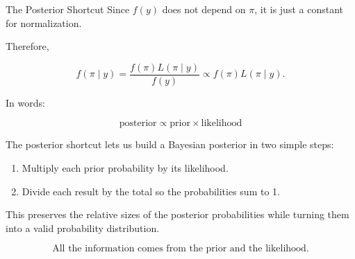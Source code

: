 \documentclass[12pt]{beamer}
\begin{document}
\begin{frame}{}
\begin{block}{The Posterior Shortcut}
Since $f(y)$ does not depend on $\pi$, it is just a constant for normalization.

\vspace{0.4cm}
Therefore,

\[
f(\pi \mid y)
= \frac{f(\pi)L(\pi \mid y)}{f(y)}
\propto f(\pi)L(\pi \mid y).
\]

\vspace{0.6cm}
In words:

\[
\boxed{\text{posterior} \propto \text{prior} \times \text{likelihood}}
\]
\end{block}
\end{frame}

\begin{frame}{}
The posterior shortcut lets us build a Bayesian posterior in two simple steps:

\begin{enumerate}
\item Multiply each prior probability by its likelihood.
\item Divide each result by the total so the probabilities sum to 1.
\end{enumerate}

\vspace{0.5cm}
This preserves the relative sizes of the posterior probabilities while turning them into a valid probability distribution.

\vspace{0.5cm}
\[
\boxed{\text{All the information comes from the prior and the likelihood.}}
\]
\end{frame}
\end{document}

